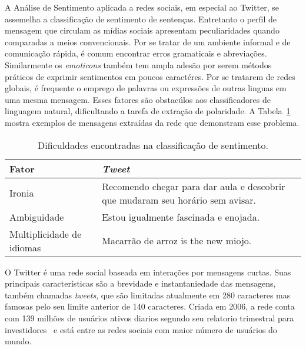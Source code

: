 A Análise de Sentimento aplicada a redes sociais, em especial ao Twitter, se
assemelha a classificação de sentimento de sentenças.
Entretanto o perfil de mensagem que circulam as mídias sociais apresentam
peculiaridades quando comparadas a meios convencionais.
Por se tratar de um ambiente informal e de comunicação rápida, é comum encontrar
erros gramaticais e abreviações.
Similarmente os \textit{emoticons} também tem ampla adesão por serem métodos
práticos de exprimir sentimentos em poucos caractéres.
Por se tratarem de redes globais, é frequente o emprego de palavras ou
expressões de outras linguas em uma mesma mensagem.
Esses fatores são obstacúlos aos classificadores de linguagem natural,
dificultando a tarefa de extração de polaridade.
A Tabela~\ref{tab:sentiment_complexity} mostra exemplos de mensagens extraídas
da rede que demonstram esse problema.

\begin{table}[h]
    \begin{center}
        \begin{tabular}{| l | p{10cm} |}
        \hline
        \textbf{Fator} & \textbf{\textit{Tweet}} \\ \hline
        Ironia & Recomendo chegar para dar aula e descobrir que mudaram seu horário sem avisar. \\ \hline
        Ambiguidade & Estou igualmente fascinada e enojada. \\ \hline
        Multiplicidade de idiomas & Macarrão de arroz is the new miojo. \\ \hline
        \end{tabular}
        \caption{Dificuldades encontradas na classificação de sentimento.}
        \label{tab:sentiment_complexity}
    \end{center}
\end{table}

O Twitter é uma rede social baseada em interações por mensagens curtas.
Suas principais características são a brevidade e instantaniedade das mensagens,
também chamadas \textit{tweets}, que são limitadas atualmente em 280 caracteres
mas famosas pelo seu limite anterior de 140 caracteres.
Criada em 2006, a rede conta com 139 milhões de usuários ativos diarios segundo
seu relatorio trimestral para investidores~\cite{twitterreport19} e está entre
as redes sociais com maior número de usuários do mundo.

